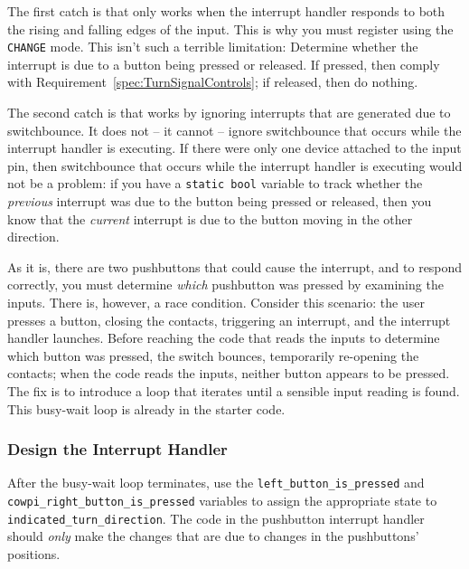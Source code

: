 The first catch is that  only works when the interrupt handler responds to both the rising and falling edges of the input.
This is why you must register  using the \lstinline{CHANGE} mode.
This isn't such a terrible limitation:
Determine whether the interrupt is due to a button being pressed or released.
If pressed, then comply with Requirement~\ref{spec:TurnSignalControls};
if released, then do nothing.

The second catch is that  works by ignoring interrupts that are generated due to switchbounce.
It does not -- it cannot -- ignore switchbounce that occurs while the interrupt handler is executing.
If there were only one device attached to the input pin, then switchbounce that occurs while the interrupt handler is executing would not be a problem:
if you have a \lstinline{static bool} variable to track whether the \textit{previous} interrupt was due to the button being pressed or released, then you know that the \textit{current} interrupt is due to the button moving in the other direction.

As it is, there are two pushbuttons that could cause the interrupt, and to respond correctly, you must determine \textit{which} pushbutton was pressed by examining the inputs.
There is, however, a race condition.
Consider this scenario: the user presses a button, closing the contacts, triggering an interrupt, and the interrupt handler launches.
Before reaching the code that reads the inputs to determine which button was pressed, the switch bounces, temporarily re-opening the contacts;
when the code reads the inputs, neither button appears to be pressed.
The fix is to introduce a loop that iterates until a sensible input reading is found.
This busy-wait loop is already in the starter code.

\subsubsection{Design the Interrupt Handler}

After the busy-wait loop terminates, use the \lstinline{left_button_is_pressed} and \\ \lstinline{cowpi_right_button_is_pressed} variables to assign the appropriate state to \\ \lstinline{indicated_turn_direction}.
The code in the pushbutton interrupt handler should \textit{only} make the changes that are due to changes in the pushbuttons' positions.


